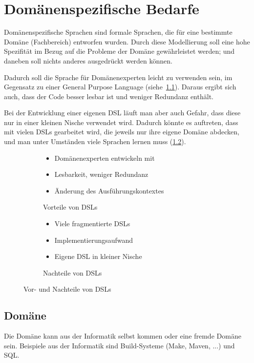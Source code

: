 \documentclass[../InterneDSLs.tex]{subfiles}
\begin{document}
\chapter{Domänenspezifische Bedarfe}
Domänenspezifische Sprachen sind formale Sprachen, die für eine bestimmte Domäne (Fachbereich) entworfen wurden. Durch diese Modellierung soll eine hohe Spezifität im Bezug auf die Probleme der Domäne gewährleistet werden; und daneben soll nichts anderes ausgedrückt werden können.

Dadurch soll die Sprache für Domänenexperten leicht zu verwenden sein, im Gegensatz zu einer General Purpose Language (siehe~\ref{FIG:DslAdvantages}). Daraus ergibt sich auch, dass der Code besser lesbar ist und weniger Redundanz enthält.

Bei der Entwicklung einer eigenen DSL läuft man aber auch Gefahr, dass diese nur in einer kleinen Nische verwendet wird. Dadurch könnte es auftreten, dass mit vielen DSLs gearbeitet wird, die jeweils nur ihre eigene Domäne abdecken, und man unter Umständen viele Sprachen lernen muss (\ref{FIG:DslDisadvantages}).

\begin{figure}[ht]
\centering
  \begin{subfigure}[c]{0.49\textwidth}
    \begin{itemize}
	  \item Domänenexperten entwickeln mit
	  \item Lesbarkeit, weniger Redundanz
	  \item Änderung des Ausführungskontextes
    \end{itemize}
    \caption{Vorteile von DSLs}
    \label{FIG:DslAdvantages}
  \end{subfigure}
  \begin{subfigure}[c]{0.49\textwidth}
    \begin{itemize}
	  \item Viele fragmentierte DSLs
	  \item Implementierungsaufwand
	  \item Eigene DSL in kleiner Nische
    \end{itemize}
    \caption{Nachteile von DSLs}
    \label{FIG:DslDisadvantages}
  \end{subfigure}
  \caption{Vor- und Nachteile von DSLs}
  \label{FIG:DslAdvantagesDisadvantages}
\end{figure}


\section{Domäne}
Die Domäne kann aus der Informatik selbst kommen oder eine fremde Domäne sein. Beispiele aus der Informatik sind Build-Systeme (Make, Maven, ...) und SQL.
\end{document}
